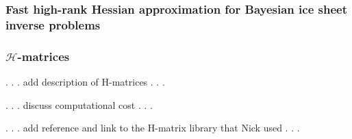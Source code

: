\documentclass[10pt,final,xcolor=dvipsnames]{beamer}
\begin{document}
\begin{frame}
  \frametitle{Fast high-rank Hessian approximation for Bayesian ice sheet inverse problems}

 
 
\end{frame}
\begin{frame}
  \frametitle{$\mathcal{H}$-matrices}

  . . . add description of H-matrices . . .

  . . . discuss computational cost . . .

  . . . add reference and link to the H-matrix library that Nick used . . .
  

\end{frame}
\end{document}
